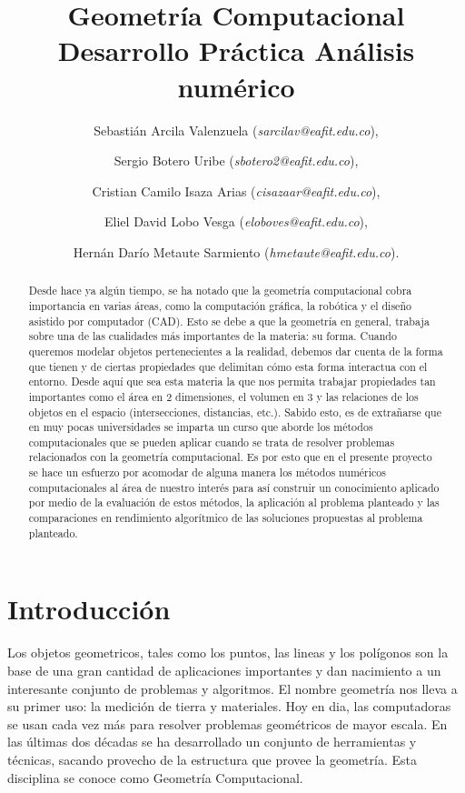 \documentclass[final, 12pt letterpaper]{article}
\begin{document}
\title{Geometría Computacional \\
       Desarrollo Práctica  Análisis numérico}
\author{Sebastián Arcila Valenzuela (\textit{sarcilav@eafit.edu.co}),
\and{} Sergio Botero Uribe (\textit{sbotero2@eafit.edu.co}), 
\and{} Cristian Camilo Isaza Arias (\textit{cisazaar@eafit.edu.co}),
\and{} Eliel David Lobo Vesga (\textit{eloboves@eafit.edu.co}), 
\and{} Hernán Darío Metaute Sarmiento (\textit{hmetaute@eafit.edu.co}).
}
\maketitle      
\begin{abstract}
Desde hace ya algún tiempo, se ha notado que la geometría computacional cobra importancia en varias áreas, como la computación gráfica, la robótica y el diseño asistido por computador (CAD). Esto se debe a que la geometría en general, trabaja sobre una de las cualidades más importantes de la materia: su forma. Cuando queremos modelar objetos pertenecientes a la realidad, debemos dar cuenta de la forma que tienen y de ciertas propiedades que delimitan cómo esta forma interactua con el entorno. Desde aquí que sea esta materia la que nos permita trabajar propiedades tan importantes como el área en 2 dimensiones, el volumen en 3 y las relaciones de los objetos en el espacio (intersecciones, distancias, etc.). Sabido esto, es de extrañarse que en muy pocas universidades se imparta un curso que aborde los métodos computacionales que se pueden aplicar cuando se trata de resolver problemas relacionados con la geometría computacional.  Es por esto que en el presente proyecto se hace un esfuerzo por acomodar de alguna manera los métodos numéricos computacionales al área de nuestro interés para así construir un conocimiento aplicado por medio de la evaluación de estos métodos, la aplicación al problema planteado y las comparaciones en rendimiento algorítmico de las soluciones propuestas al problema planteado.
\end{abstract}
\clearpage

\section{Introducción}
Los objetos geometricos, tales como los puntos, las lineas y los polígonos son la base de una gran cantidad de aplicaciones importantes y dan nacimiento a un interesante conjunto de problemas y algoritmos. El nombre geometría nos lleva a su primer uso: la medición de tierra y materiales. Hoy en dia, las computadoras se usan cada vez más para resolver problemas geométricos de mayor escala. En las últimas dos décadas se ha desarrollado un conjunto de herramientas y técnicas, sacando provecho de la  estructura que provee la geometría. Esta disciplina se conoce como Geometría Computacional.\medskip
\end{document}
